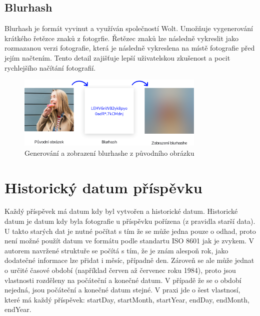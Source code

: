 \documentclass[12pt, a4paper,
 twoside,        %
 openright
]{report}
\begin{document}
\subsection{Blurhash}\label{subsection:blurhash}
Blurhash je formát vyvinut a využíván společností Wolt. Umožňuje vygenerování krátkého řetězce znaků z fotogrfie.
Řetězec znaků lze následně vykreslit jako rozmazanou verzi fotografie, která je následně vykreslena na místě fotografie před jejím načtením.
Tento detail zajišťuje lepší uživatelskou zkušenost a pocit rychlejšího načítání fotografií.

\begin{figure}[h]
	\centering
	\includegraphics[width=0.8\textwidth]{images/blurhash.png}
	\caption{Generování a zobrazení blurhashe z původního obrázku}
\end{figure}
	
\section{Historický datum příspěvku}\label{section:historical_date}
Každý příspěvek má datum kdy byl vytvořen a historické datum. Historické datum je datum kdy byla fotografie u příspěvku pořízena (z pravidla starší data). U takto starých dat je nutné počítat s tím že se může jedna pouze o odhad, proto není možné použít datum ve formátu podle standartu ISO 8601 jak je zvykem. V autorem navržené struktuře se počítá s tím, že je znám alespoň rok, jako dodatečné informace lze přidat i měsíc, případně den. Zároveň se ale může jednat o určité časové období (například červen až červenec roku 1984), proto jsou vlastnosti rozděleny na počáteční a konečné datum. V případě že se o období nejedná, jsou počáteční a konečné datum stejné. V praxi jde o šest vlastnosí, které má každý příspěvek: startDay, startMonth, startYear, endDay, endMonth, endYear.
\end{document}
